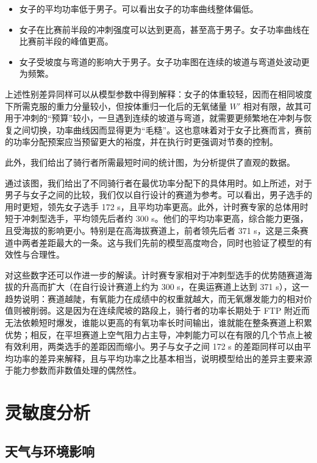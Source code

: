 \documentclass[11pt,a4paper]{ctexart}
\begin{document}
\begin{itemize}
\item 女子的平均功率低于男子。可以看出女子的功率曲线整体偏低。
\item 女子在比赛前半段的冲刺强度可以达到更高，甚至高于男子。女子功率曲线在比赛前半段的峰值更高。
\item 女子受坡度与弯道的影响大于男子。女子功率图在连续的坡道与弯道处波动更为频繁。
\end{itemize}

上述性别差异同样可以从模型参数中得到解释：女子的体重较轻，因而在相同坡度下所需克服的重力分量较小，但按体重归一化后的无氧储量 $W'$ 相对有限，故其可用于冲刺的“预算”较小，一旦遇到连续的坡道与弯道，就需要更频繁地在冲刺与恢复之间切换，功率曲线因而显得更为“毛糙”。这也意味着对于女子比赛而言，赛前的功率分配预案应当预留更大的裕度，并在执行时更强调对节奏的控制。

此外，我们给出了骑行者所需最短时间的统计图，为分析提供了直观的数据。

通过该图，我们给出了不同骑行者在最优功率分配下的具体用时。如上所述，对于男子与女子之间的比较，我们仅以自行设计的赛道为参考。可以看出，男子选手的用时更短，领先女子选手 172 s，且平均功率更高。此外，计时赛专家的总体用时短于冲刺型选手，平均领先后者约 300 s。他们的平均功率更高，综合能力更强，且受海拔的影响更小。特别是在高海拔赛道上，前者领先后者 371 s，这是三条赛道中两者差距最大的一条。这与我们先前的模型高度吻合，同时也验证了模型的有效性与合理性。

对这些数字还可以作进一步的解读。计时赛专家相对于冲刺型选手的优势随赛道海拔的升高而扩大（在自行设计赛道上约为 300 s，在奥运赛道上达到 371 s），这一趋势说明：赛道越陡，有氧能力在成绩中的权重就越大，而无氧爆发能力的相对价值则被削弱。这是因为在连续爬坡的路段上，骑行者的功率长期处于 FTP 附近而无法依赖短时爆发，谁能以更高的有氧功率长时间输出，谁就能在整条赛道上积累优势；相反，在平坦赛道上空气阻力占主导，冲刺能力可以在有限的几个节点上被有效利用，两类选手的差距因而缩小。男子与女子之间 172 s 的差距同样可以由平均功率的差异来解释，且与平均功率之比基本相当，说明模型给出的差异主要来源于能力参数而非数值处理的偶然性。

\section{灵敏度分析}

\subsection{天气与环境影响}
\end{document}
